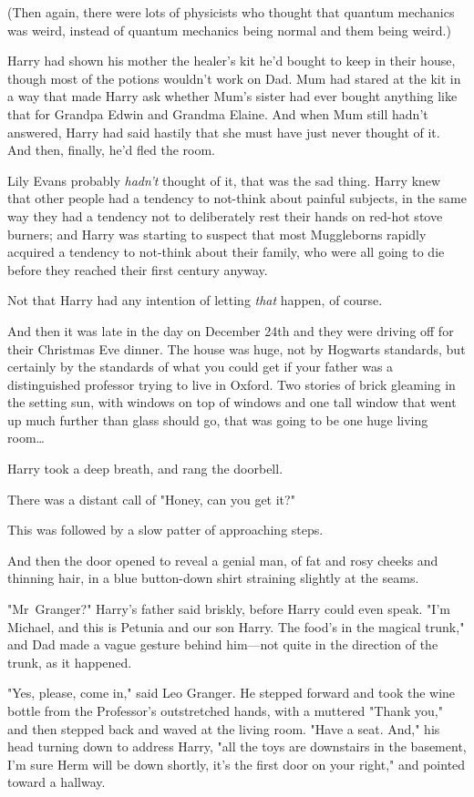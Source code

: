 (Then again, there were lots of physicists who thought that quantum mechanics
was weird, instead of quantum mechanics being normal and them being weird.)

Harry had shown his mother the healer's kit he'd bought to keep in their house,
though most of the potions wouldn't work on Dad. Mum had stared at the kit in a
way that made Harry ask whether Mum's sister had ever bought anything like that
for Grandpa Edwin and Grandma Elaine. And when Mum still hadn't answered, Harry
had said hastily that she must have just never thought of it. And then,
finally, he'd fled the room.

Lily Evans probably \emph{hadn't} thought of it, that was the sad thing. Harry
knew that other people had a tendency to not-think about painful subjects, in
the same way they had a tendency not to deliberately rest their hands on
red-hot stove burners; and Harry was starting to suspect that most Muggleborns
rapidly acquired a tendency to not-think about their family, who were all going
to die before they reached their first century anyway.

Not that Harry had any intention of letting \emph{that} happen, of course.

And then it was late in the day on December 24th and they were driving off for
their Christmas Eve dinner.
\later
The house was huge, not by Hogwarts standards, but certainly by the standards
of what you could get if your father was a distinguished professor trying to
live in Oxford. Two stories of brick gleaming in the setting sun, with windows
on top of windows and one tall window that went up much further than glass
should go, that was going to be one huge living room…

Harry took a deep breath, and rang the doorbell.

There was a distant call of "Honey, can you get it?"

This was followed by a slow patter of approaching steps.

And then the door opened to reveal a genial man, of fat and rosy cheeks and
thinning hair, in a blue button-down shirt straining slightly at the seams.

"Mr~Granger?" Harry's father said briskly, before Harry could even speak. "I'm
Michael, and this is Petunia and our son Harry. The food's in the magical
trunk," and Dad made a vague gesture behind him—not quite in the direction of
the trunk, as it happened.

"Yes, please, come in," said Leo Granger. He stepped forward and took the wine
bottle from the Professor's outstretched hands, with a muttered "Thank you,"
and then stepped back and waved at the living room. "Have a seat. And," his
head turning down to address Harry, "all the toys are downstairs in the
basement, I'm sure Herm will be down shortly, it's the first door on your
right," and pointed toward a hallway.

